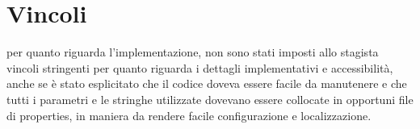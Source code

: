 \section{Vincoli}
per quanto riguarda l'implementazione, non sono stati imposti allo stagista vincoli stringenti per quanto riguarda i dettagli implementativi e accessibilità, anche se è stato esplicitato che il codice doveva essere facile da manutenere e che tutti i parametri e le stringhe utilizzate dovevano essere collocate in opportuni file di properties, in maniera da rendere facile configurazione e localizzazione.